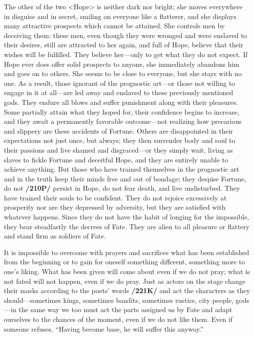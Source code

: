 The other of the two <Hope> is neither dark nor bright; she moves everywhere in disguise and in secret, smiling on everyone like a flatterer, and she displays many attractive prospects which cannot be attained. She controls men by deceiving them: these men, even though they were wronged and were enslaved to their desires, still are attracted to her again, and full of Hope, believe that their wishes will be fulfilled. They believe her—only to get what they do not expect. If Hope ever does offer solid prospects to anyone, she immediately abandons him and goes on to others. She seems to be close to everyone, but she stays with no one. As a result, those ignorant of the prognostic art—or those not willing to engage in it at all—are led
away and enslaved to these previously mentioned gods. They endure all blows and suffer punishment along with their pleasures. Some partially attain what they hoped for, their confidence begins to increase, and they await a permanently favorable outcome—not realizing how precarious and slippery are these accidents of Fortune. Others are disappointed in their expectations not just once, but always; they then surrender body and soul to their passions and live shamed and disgraced—or they simply wait, living as slaves to fickle Fortune and deceitful Hope, and they are entirely unable to achieve anything. But those who have trained themselves in the prognostic art and in the truth keep their minds free and out of bondage; they despise Fortune, do not \textbf{/210P/} persist in Hope, do not fear death, and live undisturbed. They have trained their souls to be confident. They do not rejoice excessively at prosperity nor are they depressed by adversity, but they are satisfied with whatever happens. Since they do not have the habit of longing for the impossible, they bear steadfastly the decrees of Fate. They are alien to all pleasure or flattery and stand firm as soldiers of Fate.

It is impossible to overcome with prayers and sacrifices what has been established from the beginning or to gain for oneself something different, something more to one’s liking. What has been given will come about even if we do not pray; what is not fated will not happen, even if we do pray. Just as actors on the stage change their masks according to the poets’ words \textbf{/221K/} and act the characters as they should—sometimes kings, sometimes bandits, sometimes rustics, city people, gods—in the same way we too must act the parts assigned us by Fate and adapt ourselves to the chances of the moment, even if we do not like them. Even if someone refuses,
“Having become base, he will suffer this anyway.” 


